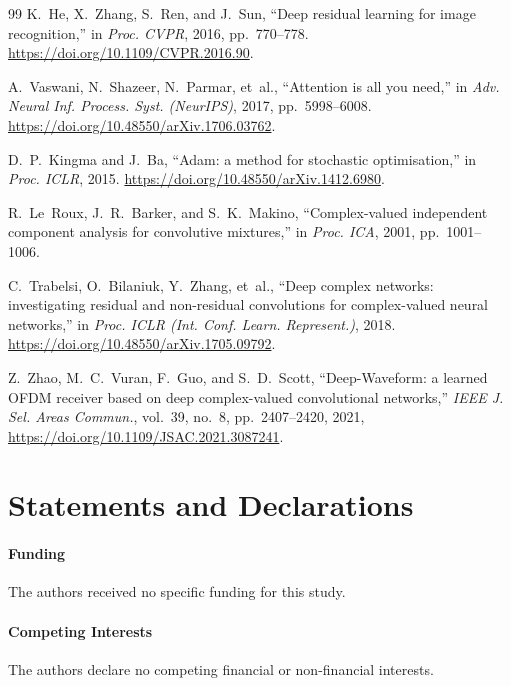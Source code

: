 \documentclass[twocolumn,english]{svjour3}
\begin{document}
\begin{thebibliography}{99}
K.~He, X.~Zhang, S.~Ren, and J.~Sun,
``Deep residual learning for image recognition,''
in \emph{Proc. CVPR}, 2016, pp.~770--778. \url{https://doi.org/10.1109/CVPR.2016.90}.

A.~Vaswani, N.~Shazeer, N.~Parmar, et~al.,
``Attention is all you need,''
in \emph{Adv. Neural Inf. Process. Syst. (NeurIPS)}, 2017, pp.~5998--6008. \url{https://doi.org/10.48550/arXiv.1706.03762}.

D.~P.~Kingma and J.~Ba,
``Adam: a method for stochastic optimisation,''
in \emph{Proc. ICLR}, 2015. \url{https://doi.org/10.48550/arXiv.1412.6980}.

R.~Le~Roux, J.~R.~Barker, and S.~K.~Makino,
``Complex-valued independent component analysis for convolutive mixtures,''
in \emph{Proc. ICA}, 2001, pp.~1001--1006.

C.~Trabelsi, O.~Bilaniuk, Y.~Zhang, et~al.,
``Deep complex networks: investigating residual and non-residual convolutions for complex-valued neural networks,''
in \emph{Proc. ICLR (Int. Conf. Learn. Represent.)}, 2018. \url{https://doi.org/10.48550/arXiv.1705.09792}.

Z.~Zhao, M.~C.~Vuran, F.~Guo, and S.~D.~Scott,
``Deep-Waveform: a learned OFDM receiver based on deep complex-valued convolutional networks,''
\emph{IEEE J. Sel. Areas Commun.}, vol.~39, no.~8, pp.~2407--2420, 2021, \url{https://doi.org/10.1109/JSAC.2021.3087241}.



\end{thebibliography}

\section*{Statements and Declarations}

\paragraph{Funding}
The authors received no specific funding for this study.

\paragraph{Competing Interests}
The authors declare no competing financial or non-financial interests.
\end{document}
